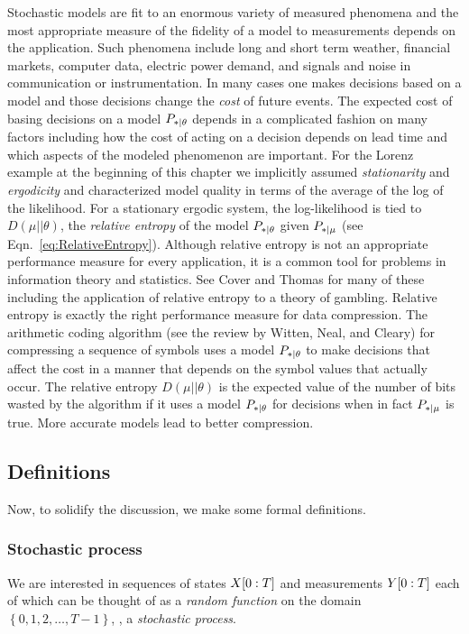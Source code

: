 Stochastic models are fit to an enormous variety of measured phenomena
and the most appropriate measure of the fidelity of a model to
measurements depends on the application.  Such phenomena include long
and short term weather, financial markets, computer data, electric
power demand, and signals and noise in communication or
instrumentation.  In many cases one makes decisions based on a model
and those decisions change the \emph{cost} of future events.  The
expected cost of basing decisions on a model $P_{*\mid \theta}$ depends in
a complicated fashion on many factors including how the cost of acting
on a decision depends on lead time and which aspects of the modeled
phenomenon are important.  For the Lorenz example at the beginning of
this chapter we implicitly assumed \emph{stationarity} and
\emph{ergodicity} and characterized model quality in terms of the
average of the log of the likelihood.  For a stationary ergodic
system, the log-likelihood is tied to $D(\mu||\theta)$, the
\emph{relative entropy} of the model $P_{*\mid \theta}$ given $P_{*\mid \mu}$
(see Eqn.~\eqref{eq:RelativeEntropy}).  Although relative entropy is
not an appropriate performance measure for every application, it is a
common tool for problems in information theory and statistics.  See
Cover and Thomas\cite{Cover91} for many of these including the
application of relative entropy to a theory of gambling.  Relative
entropy is exactly the right performance measure for data compression.
The arithmetic coding algorithm (see the review by Witten, Neal, and
Cleary\cite{Witten87}) for compressing a sequence of symbols uses a
model $P_{*\mid \theta}$ to make decisions that affect the cost in a
manner that depends on the symbol values that actually occur.  The
relative entropy $D(\mu||\theta)$ is the expected value of the number
of bits wasted by the algorithm if it uses a model $P_{*\mid \theta}$ for
decisions when in fact $P_{*\mid \mu}$ is true.  More accurate models lead
to better compression.

\subsection{Definitions}
\label{sec:hDef}

Now, to solidify the discussion, we make some formal definitions.

\subsubsection{Stochastic process}
We are interested in sequences of states $X[0:T]$ and
measurements  $Y[0:T]$ each of which can be thought of as a
\emph{random function} on the domain $\left\{ 0,1,2,\ldots,T-1 \right\}$,
\ie, a \emph{stochastic process}.

